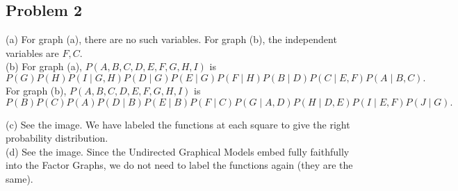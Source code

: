 \documentclass[12pt]{article}
\theoremstyle{remark}
\begin{document}
\subsection*{Problem 2} (a) For graph (a), there are no such variables. For graph (b), the independent variables are $F,C$.\\

\noindent (b) For graph (a), $P(A,B,C,D,E,F,G,H,I)$ is 
\[
P(G) P(H) P(I \mid G,H) P(D \mid G) P(E \mid G) P(F \mid H) P(B \mid D) P(C \mid E,F) P(A \mid B,C).
\]
For graph (b), $P(A,B,C,D,E,F,G,H,I)$ is
\[
P(B) P(C) P(A) P(D \mid B) P(E \mid B) P(F \mid C) P(G \mid A,D) P(H \mid D,E) P(I \mid E,F) P(J \mid G).
\]

\noindent (c) See the image. We have labeled the functions at each square to give the right probability distribution. \\

\noindent (d) See the image. Since the Undirected Graphical Models embed fully faithfully into the Factor Graphs, we do not need to label the functions again (they are the same). \\
\end{document}

